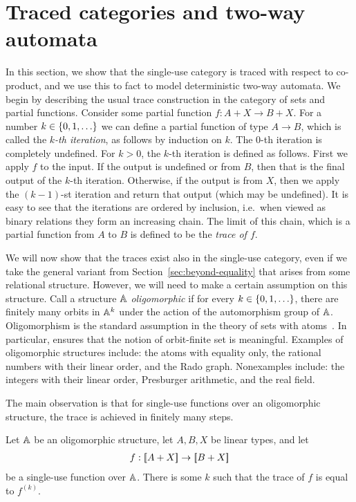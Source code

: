 \section{Traced categories and two-way automata}
\label{sec:two-way-automata}

In this section, we show that the single-use category is traced with respect to co-product, and we use this to fact to model deterministic two-way automata.
We begin by describing the usual trace construction in the category of sets and partial functions. 
Consider some partial function $
f : A + X \to B + X.$
For a number $k \in \{0,1,\ldots\}$ we can define a partial function of type $A \to B$, which is called the \emph{$k$-th iteration}, as  follows by induction on $k$. The $0$-th iteration is  completely undefined. For $k > 0$, the $k$-th iteration is defined as follows. First we apply $f$ to the input. If the output is undefined or from  $B$, then that is the final output of the $k$-th iteration. Otherwise, if the output is from $X$, then we apply the $(k-1)$-st iteration and return that output (which may be undefined). It is easy to see that the iterations are ordered by inclusion, i.e.~when viewed as binary relations they form an increasing chain. The limit of this chain, which is a partial function from $A$ to $B$ is defined to be the \emph{trace of $f$}. 

We will now show that the traces exist also in the single-use category, even if we take the general variant from Section~\ref{sec:beyond-equality} that arises from some relational structure. However, we will need to make a certain assumption on this structure. Call a structure $\mathbb A$  \emph{oligomorphic} if for every $k \in \{0,1,\ldots\}$, there  are finitely many orbits in $\mathbb A^k$ under the action of the automorphism group of $\mathbb A$.
Oligomorphism is the standard assumption in the theory of sets with atoms~\cite{bojanczyk_slightly2018}. In particular, ensures that the notion of orbit-finite set is meaningful. Examples of oligomorphic structures include: the atoms with equality only, the rational numbers with their linear order, and the Rado graph. Nonexamples include: the integers with their linear order, Presburger arithmetic, and the real field. 



The main observation is that for single-use functions over an oligomorphic structure, the trace is achieved in finitely many steps.
\begin{lemma}\label{lem:traced-finite-iteration} Let $\mathbb A$ be an oligomorphic structure, let $A,B,X$ be linear types, and let 
    \begin{align*}
        f : [{\kern-0.45ex}[A + X]{\kern-0.45ex}] \to [{\kern-0.45ex}[B + X]{\kern-0.45ex}]
        \end{align*}
        be a single-use function over $\mathbb A$. There is some $k$ such that the trace of $f$ is equal to $f^{(k)}$.
\end{lemma}


